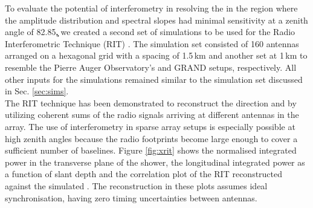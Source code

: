 To evaluate the potential of interferometry in resolving the \xmax in the region where the amplitude distribution and spectral slopes had minimal sensitivity \ie at a zenith angle of 82.85\c, we created a second set of simulations to be used for the Radio Interferometric Technique (RIT) \cite{Schoorlemmer2021}. The simulation set consisted of  160 antennas arranged on a hexagonal grid with a spacing of 1.5\,km and another set at 1\,km to resemble the Pierre Auger Observatory's and GRAND setups, respectively. All other inputs for the simulations remained similar to the simulation set discussed in Sec. \ref{sec:sims}.\\
The RIT technique has been demonstrated to reconstruct the direction and \xmax by utilizing coherent sums of the radio signals arriving at different antennas in the array. The use of interferometry in sparse array setups is especially possible at high zenith angles because the radio footprints become large enough to cover a sufficient number of baselines. Figure \ref{fig:xrit} shows the normalised integrated power in the transverse plane of the shower, the longitudinal integrated power as a function of slant depth \x and the correlation plot of the RIT reconstructed \xmax against the simulated \xmax. The reconstruction in these plots assumes ideal synchronisation, \ie having zero timing uncertainties between antennas. 

